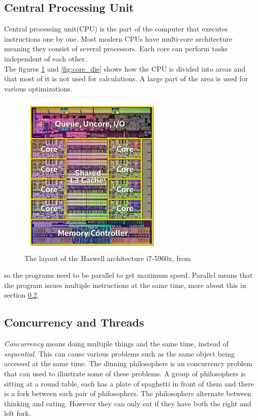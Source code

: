 \documentclass[10pt,a4paper]{report}
\begin{document}
\subsection{Central Processing Unit}
Central processing unit(CPU) is the part of the computer that executes instructions one by one\cite{introduction_hpc_hager}. Most modern CPUs have multi-core architecture meaning they consist of several processors\cite{introduction_hpc_hager}. Each core can perform tasks independent of each other.
\\
The figures \ref{fig:cpu_scheme} and \ref{fig:core_die} shows how the CPU is divided into areas and that most of it is not used for calculations. A large part of the area is used for various optimizations.

\begin{figure}[h]
    \centering
    \includegraphics[width=7cm]{cpu_scheme_haswell.jpg}
    \caption{The layout of the Haswell architecture i7-5960x, from \cite{intel_haswell_2014}}
    \label{fig:cpu_scheme}
\end{figure}

so the programs need to be parallel to get maximum speed. Parallel means that the program issues multiple instructions at the same time, more about this in section \ref{concurrency}.

\subsection{Concurrency and Threads}
\label{concurrency}
\emph{Concurrency} means doing multiple things and the same time, instead of \emph{sequential}. This can cause various problems such as the same object being accessed at the same time. The dinning philosophers is an concurrency problem that can used to illustrate some of these problems. A group of philosophers is sitting at a round table, each has a plate of spaghetti in front of them and there is a fork between each pair of philosophers\cite{hoare1985communicating}. The philosophers alternate between thinking and eating. However they can only eat if they have both the right and left fork\cite{hoare1985communicating}.
\end{document}
